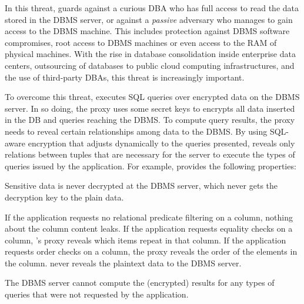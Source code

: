 
In this threat, \name{} guards against a curious DBA who has full access to
read the data stored in the DBMS server, or against a {\em passive}
adversary who manages to gain access to the DBMS machine. This includes protection against DBMS software compromises, root access to DBMS machines or even access to the RAM of physical machines.
With the rise in database consolidation inside enterprise data
centers, outsourcing of databases to public cloud computing
infrastructures, and the use of third-party DBAs, this threat is
increasingly important. %
 

To overcome this threat, \name{} executes SQL queries over encrypted
data on the DBMS server.  In so doing, the proxy uses some secret keys
to encrypts all data inserted in the DB and queries reaching the DBMS\@.
To compute query results, the proxy needs to reveal certain relationships
among data to the DBMS\@.  By using SQL-aware encryption that adjusts
dynamically to the queries presented, \name{} reveals only relations
between tuples that are necessary for the server to execute the types
of queries issued by the application.  For example, \name{} provides
the following properties:


\begin{CompactItemize}

\item Sensitive data is never decrypted at the DBMS server,
    which never gets the decryption key to the plain data.

\item If the application requests no relational predicate filtering
    on a column, nothing about the column content leaks.  If the
    application requests equality checks on a column, \name{}'s proxy
    reveals which items repeat in that column.  If the application
    requests order checks on a column, the proxy reveals the order of
    the elements in the column.  \name{} never reveals the plaintext
    data to the DBMS server.

\item The DBMS server cannot compute the (encrypted) results for any
    types of queries that were not requested by the application.

\end{CompactItemize}

